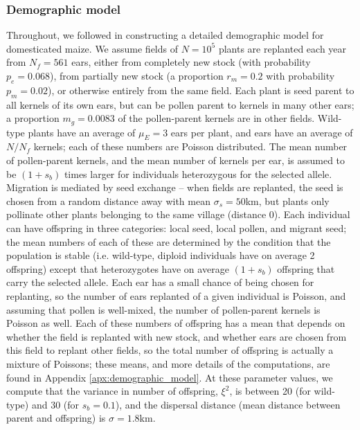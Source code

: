 \subsubsection{Demographic model}
Throughout, we followed \citet{vanHeerwaarden2010} in constructing a detailed demographic model for domesticated maize.
We assume fields of $N=10^5$ plants are replanted each year from $N_f=561$ ears, either from completely new stock (with probability $p_e=0.068$), from partially new stock (a proportion $r_m=0.2$ with probability $p_m=0.02$), or  otherwise entirely from the same field.
Each plant is seed parent to all kernels of its own ears, but can be pollen parent to kernels in many other ears; a proportion $m_g=0.0083$ of the pollen-parent kernels are in other fields.
Wild-type plants have an average of $\mu_E=3$ ears per plant, and ears have an average of $N/N_f$ kernels; each of these numbers are Poisson distributed.
The mean number of pollen-parent kernels, and the mean number of kernels per ear, is assumed to be $(1+s_b)$ times larger for individuals heterozygous for the selected allele.
Migration is mediated by seed exchange -- when fields are replanted, the seed is chosen from a random distance away with mean $\sigma_s=50$km, but plants only pollinate other plants belonging to the same village (distance 0).
Each individual can have offspring in three categories: local seed, local pollen, and migrant seed; the mean numbers of each of these are determined by the condition that the population is stable (i.e. wild-type, diploid individuals have on average 2 offspring) except that heterozygotes have on average $(1+s_b)$ offspring that carry the selected allele.
Each ear has a small chance of being chosen for replanting, so the number of ears replanted of a given individual is Poisson, and assuming that pollen is well-mixed, the number of pollen-parent kernels is Poisson as well.
Each of these numbers of offspring has a mean that depends on whether the field is replanted with new stock, and whether ears are chosen from this field to replant other fields, so the total number of offspring is actually a mixture of Poissons; these means, and more details of the computations, are found in Appendix \ref{apx:demographic_model}.
At these parameter values, we compute that the variance in number of offspring, $\xi^2$, is between 20 (for wild-type) and 30 (for $s_b=0.1$), and the dispersal distance (mean distance between parent and offspring) is $\sigma=1.8$km.\\

